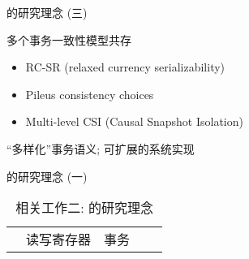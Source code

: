 \begin{frame}{\ideadt{}的研究理念 (三)}
  \begin{table}[]
	\centering
	\renewcommand\arraystretch{1.5}
  \end{table}

  \pause

  \begin{description}
	\setlength{\itemsep}{5pt}
	\item[思想:] 多个事务一致性模型共存
	\item[典型:] 
	  \begin{itemize}
		\item RC-SR {\scriptsize (relaxed currency serializability)} 
		\item Pileus consistency choices 
		\item Multi-level CSI {\scriptsize (Causal Snapshot Isolation)} 
	  \end{itemize}
	  \pause
	\item[挑战:] ``多样化''事务语义; 可扩展的系统实现
  \end{description}
\end{frame}
\begin{frame}{\idearm{}的研究理念 (一)}
  \begin{table}
	\centering
	\begin{tabular}{|c|c|c|c|c|}
	  \hline
	  & 读写寄存器 & 事务
	\end{tabular}
	\caption{相关工作二: \idearm{}的研究理念}
	\label{tbl:idearm-related-work}
  \end{table}
\end{frame}

